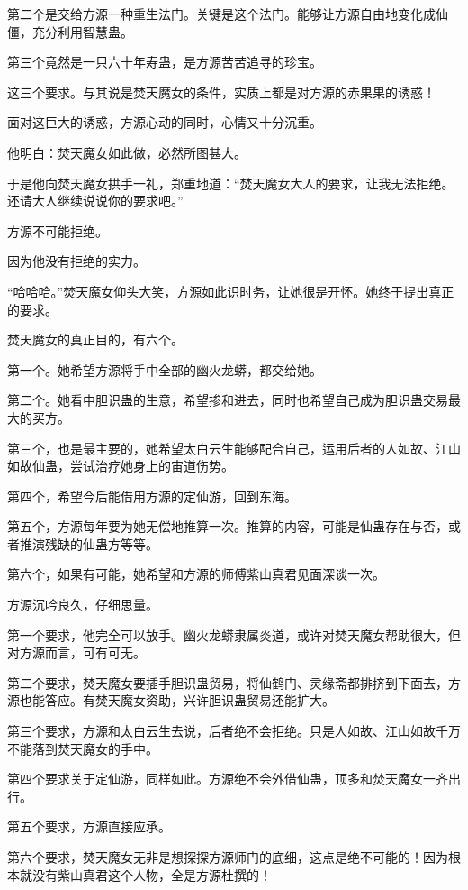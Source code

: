 \begin{this_body}
第二个是交给方源一种重生法门。关键是这个法门。能够让方源自由地变化成仙僵，充分利用智慧蛊。

第三个竟然是一只六十年寿蛊，是方源苦苦追寻的珍宝。

这三个要求。与其说是焚天魔女的条件，实质上都是对方源的赤果果的诱惑！

面对这巨大的诱惑，方源心动的同时，心情又十分沉重。

他明白：焚天魔女如此做，必然所图甚大。

于是他向焚天魔女拱手一礼，郑重地道：“焚天魔女大人的要求，让我无法拒绝。还请大人继续说说你的要求吧。”

方源不可能拒绝。

因为他没有拒绝的实力。

“哈哈哈。”焚天魔女仰头大笑，方源如此识时务，让她很是开怀。她终于提出真正的要求。

焚天魔女的真正目的，有六个。

第一个。她希望方源将手中全部的幽火龙蟒，都交给她。

第二个。她看中胆识蛊的生意，希望掺和进去，同时也希望自己成为胆识蛊交易最大的买方。

第三个，也是最主要的，她希望太白云生能够配合自己，运用后者的人如故、江山如故仙蛊，尝试治疗她身上的宙道伤势。

第四个，希望今后能借用方源的定仙游，回到东海。

第五个，方源每年要为她无偿地推算一次。推算的内容，可能是仙蛊存在与否，或者推演残缺的仙蛊方等等。

第六个，如果有可能，她希望和方源的师傅紫山真君见面深谈一次。

方源沉吟良久，仔细思量。

第一个要求，他完全可以放手。幽火龙蟒隶属炎道，或许对焚天魔女帮助很大，但对方源而言，可有可无。

第二个要求，焚天魔女要插手胆识蛊贸易，将仙鹤门、灵缘斋都排挤到下面去，方源也能答应。有焚天魔女资助，兴许胆识蛊贸易还能扩大。

第三个要求，方源和太白云生去说，后者绝不会拒绝。只是人如故、江山如故千万不能落到焚天魔女的手中。

第四个要求关于定仙游，同样如此。方源绝不会外借仙蛊，顶多和焚天魔女一齐出行。

第五个要求，方源直接应承。

第六个要求，焚天魔女无非是想探探方源师门的底细，这点是绝不可能的！因为根本就没有紫山真君这个人物，全是方源杜撰的！

\end{this_body}

